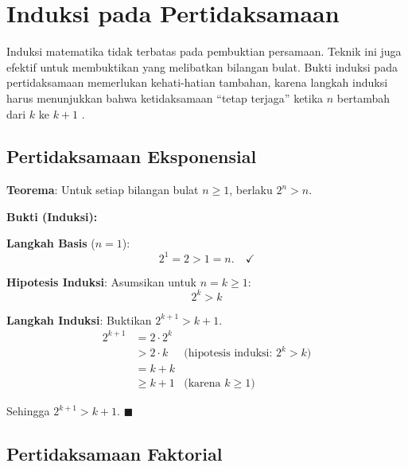 \section{Induksi pada Pertidaksamaan}

Induksi matematika tidak terbatas pada pembuktian persamaan. Teknik ini juga efektif untuk membuktikan  yang melibatkan bilangan bulat. Bukti induksi pada pertidaksamaan memerlukan kehati-hatian tambahan, karena langkah induksi harus menunjukkan bahwa ketidaksamaan ``tetap terjaga'' ketika $n$ bertambah dari $k$ ke $k+1$ \cite{rosen2019}.

\subsection{Pertidaksamaan Eksponensial}

\begin{contoh}
\textbf{Teorema}: Untuk setiap bilangan bulat $n \geq 1$, berlaku $2^n > n$.

\textbf{Bukti (Induksi):}

\textbf{Langkah Basis} ($n = 1$):
\[ 2^1 = 2 > 1 = n. \quad \checkmark \]

\textbf{Hipotesis Induksi}: Asumsikan untuk $n = k \geq 1$:
\[ 2^k > k \]

\textbf{Langkah Induksi}: Buktikan $2^{k+1} > k + 1$.
\begin{align*}
2^{k+1} &= 2 \cdot 2^k \\
         &> 2 \cdot k  & \text{(hipotesis induksi: } 2^k > k) \\
         &= k + k \\
         &\geq k + 1 & \text{(karena } k \geq 1)
\end{align*}

Sehingga $2^{k+1} > k + 1$. $\blacksquare$
\end{contoh}

\subsection{Pertidaksamaan Faktorial}

